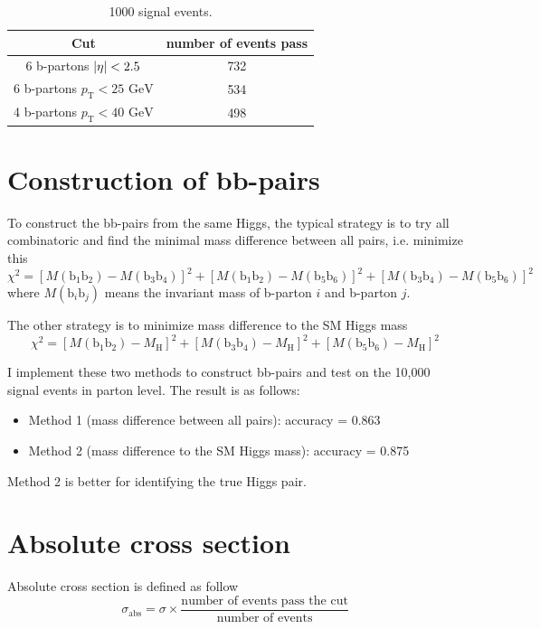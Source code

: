 \documentclass[12pt]{article}
\begin{document}
	\begin{table}[htpb]
		\centering
		\caption{1000 signal events.}
		\label{tab:cutflow_table_signal}
		\begin{tabular}{cc}
			Cut & number of events pass \\ 
			\hline
			6 b-partons $\abs{\eta}<2.5$ & 732 \\
			6 b-partons $p_\text{T} < 25 \text{ GeV}$ & 534 \\
			4 b-partons $p_\text{T} < 40 \text{ GeV}$ & 498                            
		\end{tabular}	
	\end{table}

\section{Construction of bb-pairs}%
\label{sec:construction_of_bb_pairs}
	To construct the bb-pairs from the same Higgs, the typical strategy is to try all combinatoric and find the minimal mass difference between all pairs, i.e. minimize this
	\[
		\chi^2 = [M(\text{b}_1\text{b}_2) - M(\text{b}_3 \text{b}_4)]^2 + [M(\text{b}_1\text{b}_2) - M(\text{b}_5 \text{b}_6)]^2 +[M(\text{b}_3\text{b}_4) - M(\text{b}_5 \text{b}_6)]^2
	\] 
	where $M(\text{b}_i \text{b}_j)$ means the invariant mass of b-parton $i$ and b-parton $j$.

	The other strategy is to minimize mass difference to the SM Higgs mass
	\[
		\chi^2 = [M(\text{b}_1\text{b}_2) - M_\text{H}]^2 + [M(\text{b}_3\text{b}_4) - M_\text{H}]^2 +[M(\text{b}_5\text{b}_6) - M_\text{H}]^2
	\] 

	I implement these two methods to construct bb-pairs and test on the 10,000 signal events in parton level. The result is as follows:
	\begin{itemize}
		\item Method 1 (mass difference between all pairs): accuracy = 0.863
		\item Method 2 (mass difference to the SM Higgs mass): accuracy = 0.875
	\end{itemize}


	Method 2 is better for identifying the true Higgs pair.

\section{Absolute cross section}%
\label{sec:absolute_cross_section}
	Absolute cross section is defined as follow
	\[
		\sigma_\text{abs} = \sigma \times \frac{\text{number of events pass the cut}}{\text{number of events}}
	\] 
\end{document}

